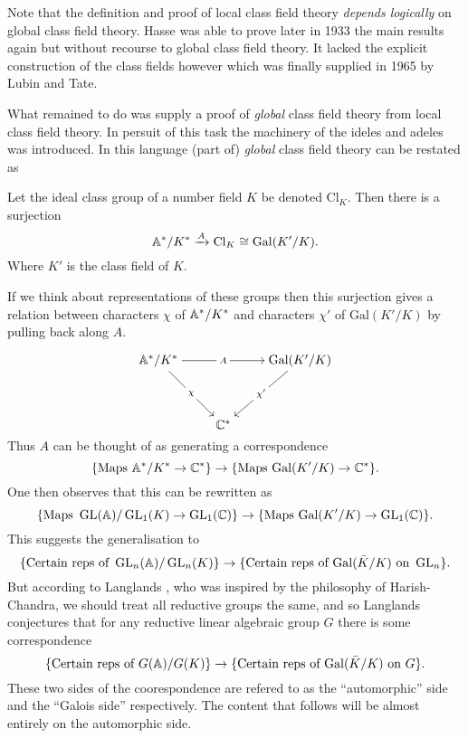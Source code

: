 Note that the definition and proof of local class field theory \textit{depends logically } on global class field theory. Hasse was able to prove later in 1933 the main results again but without recourse to global class field theory. It lacked the explicit construction of the class fields however which was finally supplied in 1965 by Lubin and Tate.

What remained to do was supply a proof of \textit{global} class field theory from local class field theory. In persuit of this task the machinery of the ideles and adeles was introduced. In this language (part of) \textit{global} class field theory can be restated as 
\begin{Theorem}
	Let the ideal class group of a number field \(K\) be denoted \(\mathrm{Cl}_K\). Then there is a surjection
	\[ \A^*/ K^* \xrightarrow{A} \mathrm{Cl}_K \cong \mathrm{Gal}(K'/K).\]
	Where \(K'\) is the class field of \(K\).
\end{Theorem}
If we think about representations of these groups then this surjection gives a relation between characters \(\chi\) of \(\A^*/K^*\) and characters \(\chi'\) of \(\mathrm{Gal}(K'/K)\) by pulling back along \(A\).

\[\begin{tikzcd}[cramped]
	{\A^*/K^*} && {\mathrm{Gal}(K'/K)} \\
	\\
	& {\C^*}
	\arrow["A"{description}, from=1-1, to=1-3]
	\arrow["\chi"{description}, from=1-1, to=3-2]
	\arrow["{\chi'}"{description}, from=1-3, to=3-2]
\end{tikzcd}\]
Thus \(A\) can be thought of as generating a correspondence
\[\{\text{Maps }\A^*/K^*\to \C^*\} \to\{ \text{Maps }\mathrm{Gal}(K'/K)\to \C^*\}. \]
One then observes that this can be rewritten as 
\[\{\text{Maps }\GL(\A)/\GL_1(K)\to \GL_1(\C)\} \to\{ \text{Maps }\mathrm{Gal}(K'/K)\to \GL_1(\C)\} .\]
This suggests the generalisation to 
\[\{\text{Certain reps of }\GL_n(\A)/\GL_n(K)\} \to\{ \text{Certain reps of  }\mathrm{Gal}(\bar{K}/K)\text{ on } \GL_n\}   .\]
But according to Langlands \cite{langlandsREPRESENTATIONTHEORYITS}, who was inspired by the philosophy of Harish-Chandra, we should treat all reductive groups the same, and so Langlands conjectures that for any reductive linear algebraic group \(G\) there is some correspondence
\[\{\text{Certain reps of }G(\A)/G(K)\} \to\{ \text{Certain reps of  }\mathrm{Gal}(\bar{K}/K)\text{ on } G\} .\]
These two sides of the coorespondence are refered to as the ``automorphic'' side and the ``Galois side'' respectively. The content that follows will be almost entirely on the automorphic side. 


